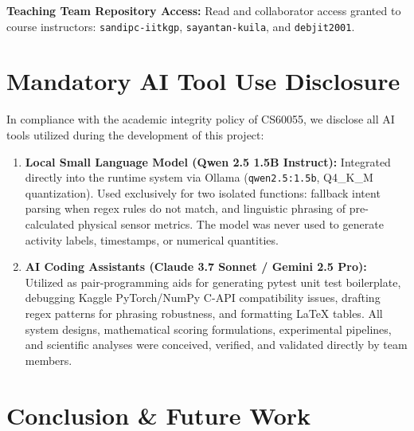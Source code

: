 \documentclass[11pt,a4paper]{article}
\begin{document}
\noindent\textbf{Teaching Team Repository Access:} Read and collaborator access granted to course instructors: \texttt{sandipc-iitkgp}, \texttt{sayantan-kuila}, and \texttt{debjit2001}.

\section{Mandatory AI Tool Use Disclosure}
\label{sec:ai_disclosure}

In compliance with the academic integrity policy of CS60055, we disclose all AI tools utilized during the development of this project:
\begin{enumerate}[leftmargin=1.5em,noitemsep,topsep=2pt]
  \item \textbf{Local Small Language Model (Qwen 2.5 1.5B Instruct):} Integrated directly into the runtime system via Ollama (\texttt{qwen2.5:1.5b}, Q4\_K\_M quantization). Used exclusively for two isolated functions: fallback intent parsing when regex rules do not match, and linguistic phrasing of pre-calculated physical sensor metrics. The model was never used to generate activity labels, timestamps, or numerical quantities.
  \item \textbf{AI Coding Assistants (Claude 3.7 Sonnet / Gemini 2.5 Pro):} Utilized as pair-programming aids for generating pytest unit test boilerplate, debugging Kaggle PyTorch/NumPy C-API compatibility issues, drafting regex patterns for phrasing robustness, and formatting LaTeX tables. All system designs, mathematical scoring formulations, experimental pipelines, and scientific analyses were conceived, verified, and validated directly by team members.
\end{enumerate}

\section{Conclusion \& Future Work}
\label{sec:conclusion}
\end{document}
